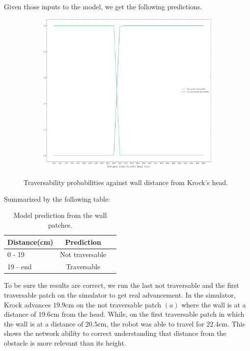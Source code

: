 \documentclass[../document.tex]{subfiles}
\begin{document}
Given those inputs to the model, we get the following predictions.
\begin{figure}[H]
    \centering
\begin{subfigure}[b]{1\textwidth}
    \includegraphics[width=\linewidth]{../img/5/custom_patches/walls_front/predictions.png}
    \end{subfigure}
    \caption{Traversability probabilities against wall distance from Krock's head.}
\end{figure}
Summarized by the following table:
\begin{table}[H]
    \centering
    \begin{tabular}{l|cc}
        Distance(cm) & Prediction \\ 
        \hline
        0 - 19  & Not traversable \\ 
        19 - end & Traversable \\ 
        \hline
    \end{tabular}
    \caption{Model prediction from the wall patches.}
\end{table}
To be sure the results are correct, we run the last not traversable  and the first traversable patch on the simulator to get real advancement. In the simulator, Krock advances $19.9$cm on the not traversable patch $(a)$ where the wall is at a distance of $19.6$cm from the head. While, on the first traversable patch in which the wall is at a distance of $20.5$cm, the robot was able to travel for $22.4$cm. This shows the network ability to correct understanding that distance from the obstacle is more relevant than its height.
\end{document}
